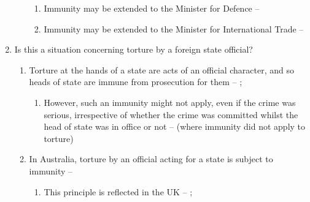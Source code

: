 \begin{enumerate}
\begin{enumerate}
\begin{enumerate}
            \item Immunity may be extended to the Minister for Defence -- 
            \item Immunity may be extended to the Minister for International Trade -- 
        \end{enumerate}
    \end{enumerate}
    \item Is this a situation concerning torture by a foreign state official?
    \begin{enumerate}
        \item Torture at the hands of a state are acts of an official character, and so heads of state are immune from prosecution for them -- ; 
        \begin{enumerate}
            \item However, such an immunity might not apply, even if the crime was serious, irrespective of whether the crime was committed whilst the head of state was in office or not --  (where immunity did not apply to torture)
        \end{enumerate}
        \item In Australia, torture by an official acting for a state is subject to immunity -- 
        \begin{enumerate}
            \item This principle is reflected in the UK -- ; 
        \end{enumerate}
    \end{enumerate}
\end{enumerate}

